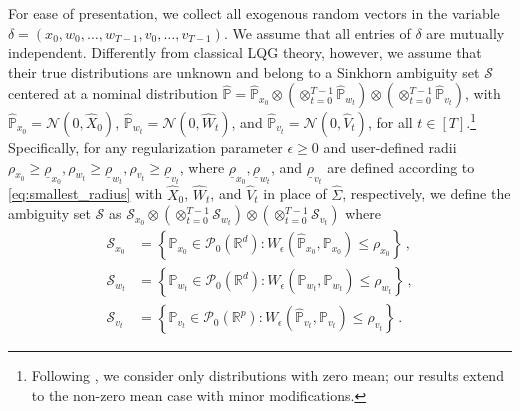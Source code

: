 \documentclass[letterpaper, 10 pt, conference]{ieeeconf}  %
\theoremstyle{ieeeconf}
\newcommand{\Prob}{\mathbb{P}}
\begin{document}
For ease of presentation, we collect all exogenous random vectors in the variable $\delta = (x_0, w_0, \dots, w_{T-1}, v_0, \dots, v_{T-1})$. We assume that all entries of $\delta$ are mutually independent.
Differently from classical LQG theory, however, we assume that their true distributions are unknown and belong to a Sinkhorn ambiguity set $\mathcal{S}$ centered at a nominal distribution $\hat{\Prob} = \hat{\Prob}_{x_0} \otimes \left(\otimes_{t=0}^{T-1} \hat{\Prob}_{w_t}\right) \otimes \left(\otimes_{t=0}^{T-1} \hat{\Prob}_{v_t}\right)$, with $\hat{\Prob}_{x_0}=\mathcal{N}(0, \hat{X}_0)$, $\hat{\Prob}_{w_t}=\mathcal{N}(0, \hat{W}_t)$, and $\hat{\Prob}_{v_t}=\mathcal{N}(0, \hat{V}_t)$, for all $t\in[T]$.\footnote{Following \cite{taskesen2023distributionally, lanzetti2024optimality, fochesato2025distributionally, falconi2025distributionally}, we consider only distributions with zero mean; our results extend to the non-zero mean case with minor modifications.} Specifically, for any regularization parameter $\epsilon\geq0$ and user-defined radii $\rho_{x_0}\geq \underline{\rho}_{x_0}, \rho_{w_t}\geq \underline{\rho}_{w_t}, \rho_{v_t}\geq \underline{\rho}_{v_t}$, where $\underline{\rho}_{x_0}, \underline{\rho}_{w_t}$, and $\underline{\rho}_{v_t}$ are defined according to \eqref{eq:smallest_radius} with $\hat{X}_0$, $\hat{W}_t$, and $\hat{V}_t$ in place of $\hat{\Sigma}$, respectively, we define the ambiguity set $\mathcal{S}$ as $\mathcal{S}_{x_0}\otimes \left(\otimes_{t=0}^{T-1} \mathcal{S}_{w_t}\right) \otimes \left(\otimes_{t=0}^{T-1} \mathcal{S}_{v_t}\right)$
where
\begin{equation*}
    \begin{aligned}
        \mathcal{S}_{x_{0}}&=\left\{\mathbb{P}_{x_{0}} \in \mathcal{P}_0(\mathbb{R}^{d}): W_{\epsilon}(\hat{\mathbb{P}}_{x_{0}}, \mathbb{P}_{x_{0}}) \leq \rho_{x_{0}}\right\}\,,
        \\
        \mathcal{S}_{w_{t}}&=\left\{\mathbb{P}_{w_{t}} \in \mathcal{P}_0(\mathbb{R}^{d}): W_{\epsilon}(\hat{\mathbb{P}}_{w_{t}}, \mathbb{P}_{w_{t}}) \leq \rho_{w_{t}}\right\}\,,
        \\
        \mathcal{S}_{v_{t}}&=\left\{\mathbb{P}_{v_{t}} \in \mathcal{P}_0(\mathbb{R}^{p}): W_{\epsilon}(\hat{\mathbb{P}}_{v_{t}},\mathbb{P}_{v_{t}}) \leq \rho_{v_{t}}\right\}\,.
    \end{aligned}
\end{equation*}
\end{document}
